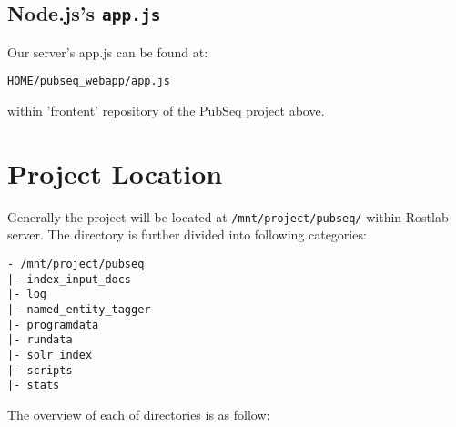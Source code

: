 \subsection{Node.js's \texttt{app.js}}

\label{sec:AppJSPath}

Our server's app.js can be found at:

\begin{center}
\texttt{HOME/pubseq\_webapp/app.js}
\end{center}

within 'frontent' repository of the PubSeq project above.


\section{Project Location}

Generally the project will be located at \texttt{/mnt/project/pubseq/} within Rostlab server. The directory is further divided into following categories:

\begin{verbatim}
- /mnt/project/pubseq
|- index_input_docs
|- log
|- named_entity_tagger
|- programdata
|- rundata
|- solr_index
|- scripts
|- stats 
\end{verbatim}

The overview of each of directories is as follow:

